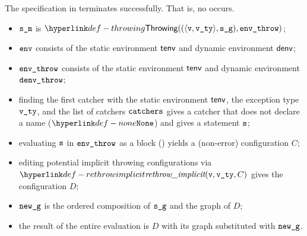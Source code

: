 
The specification in  terminates successfully.
That is, no \dynamicerrorterm{} occurs.

\ProseParagraph
\AllApply
\begin{itemize}
  \item $\sm$ is $\Throwing((\langle \vv, \vvty \rangle, \sg), \envthrow)$;
  \item $\env$ consists of the static environment $\tenv$ and dynamic environment $\denv$;
  \item $\envthrow$ consists of the static environment $\tenv$ and dynamic environment \\ $\denvthrow$;
  \item finding the first catcher with the static environment $\tenv$, the exception type $\vvty$,
        and the list of catchers $\catchers$ gives a catcher that does not declare a name ($\None$) and gives a statement $\vs$;
  \item evaluating $\vs$ in $\envthrow$ as a block () yields a (non-error)
        configuration $C$\ProseOrDynErrorDiverging;
  \item editing potential implicit throwing configurations via $\rethrowimplicit(\vv, \vvty, C)$
        gives the configuration $D$;
  \item $\newg$ is the ordered composition of $\sg$ and the graph of $D$;
  \item the result of the entire evaluation is $D$ with its graph substituted with $\newg$.
\end{itemize}

\FormallyParagraph
\begin{mathpar}
\end{mathpar}

